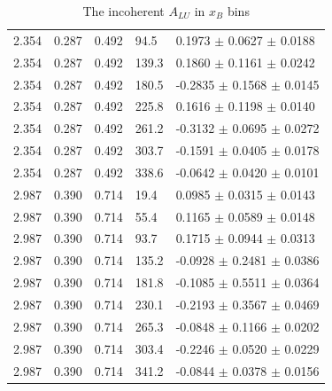 \begin{table}[!h]
\begin{center}
\begin{tabular}{||l|l|l|l|l||}
  2.354 & 0.287 & 0.492 & 94.5  &  0.1973 $\pm$ 0.0627 $\pm$ 0.0188 \\
  2.354 & 0.287 & 0.492 & 139.3 &  0.1860 $\pm$ 0.1161 $\pm$ 0.0242 \\
  2.354 & 0.287 & 0.492 & 180.5 & -0.2835 $\pm$ 0.1568 $\pm$ 0.0145 \\
  2.354 & 0.287 & 0.492 & 225.8 &  0.1616 $\pm$ 0.1198 $\pm$ 0.0140 \\
  2.354 & 0.287 & 0.492 & 261.2 & -0.3132 $\pm$ 0.0695 $\pm$ 0.0272 \\
  2.354 & 0.287 & 0.492 & 303.7 & -0.1591 $\pm$ 0.0405 $\pm$ 0.0178 \\
  2.354 & 0.287 & 0.492 & 338.6 & -0.0642 $\pm$ 0.0420 $\pm$ 0.0101 \\
 \hline                                                               
  2.987 & 0.390 & 0.714 & 19.4  &  0.0985 $\pm$ 0.0315 $\pm$ 0.0143 \\
  2.987 & 0.390 & 0.714 & 55.4  &  0.1165 $\pm$ 0.0589 $\pm$ 0.0148 \\
  2.987 & 0.390 & 0.714 & 93.7  &  0.1715 $\pm$ 0.0944 $\pm$ 0.0313 \\
  2.987 & 0.390 & 0.714 & 135.2 & -0.0928 $\pm$ 0.2481 $\pm$ 0.0386 \\
  2.987 & 0.390 & 0.714 & 181.8 & -0.1085 $\pm$ 0.5511 $\pm$ 0.0364 \\
  2.987 & 0.390 & 0.714 & 230.1 & -0.2193 $\pm$ 0.3567 $\pm$ 0.0469 \\
  2.987 & 0.390 & 0.714 & 265.3 & -0.0848 $\pm$ 0.1166 $\pm$ 0.0202 \\
  2.987 & 0.390 & 0.714 & 303.4 & -0.2246 $\pm$ 0.0520 $\pm$ 0.0229 \\
  2.987 & 0.390 & 0.714 & 341.2 & -0.0844 $\pm$ 0.0378 $\pm$ 0.0156 \\
 \hline
 \hline
 \end{tabular}
 \caption{The incoherent $A_{LU}$ in $x_B$ bins}
 \label{table:InCoh_xB_BSA}
 \end{center}
\end{table}



